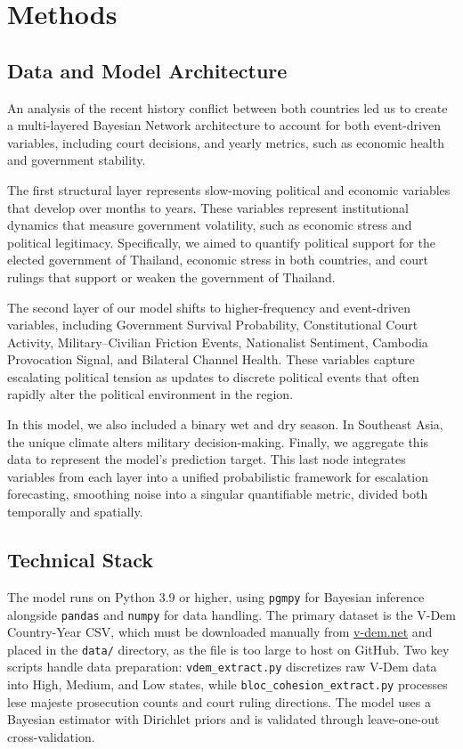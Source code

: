 \documentclass[12pt]{article}
\begin{document}
\section*{Methods}

\subsection*{Data and Model Architecture}

An analysis of the recent history conflict between both countries led us to create a multi-layered Bayesian Network architecture to account for both event-driven variables, including court decisions, and yearly metrics, such as economic health and government stability.

The first structural layer represents slow-moving political and economic variables that develop over months to years. These variables represent institutional dynamics that measure government volatility, such as economic stress and political legitimacy. Specifically, we aimed to quantify political support for the elected government of Thailand, economic stress in both countries, and court rulings that support or weaken the government of Thailand.

The second layer of our model shifts to higher-frequency and event-driven variables, including Government Survival Probability, Constitutional Court Activity, Military--Civilian Friction Events, Nationalist Sentiment, Cambodia Provocation Signal, and Bilateral Channel Health. These variables capture escalating political tension as updates to discrete political events that often rapidly alter the political environment in the region.

In this model, we also included a binary wet and dry season. In Southeast Asia, the unique climate alters military decision-making. Finally, we aggregate this data to represent the model's prediction target. This last node integrates variables from each layer into a unified probabilistic framework for escalation forecasting, smoothing noise into a singular quantifiable metric, divided both temporally and spatially.

\subsection*{Technical Stack}

The model runs on Python 3.9 or higher, using \texttt{pgmpy} for Bayesian inference alongside \texttt{pandas} and \texttt{numpy} for data handling. The primary dataset is the V-Dem Country-Year CSV, which must be downloaded manually from \url{v-dem.net} and placed in the \texttt{data/} directory, as the file is too large to host on GitHub. Two key scripts handle data preparation: \texttt{vdem\_extract.py} discretizes raw V-Dem data into High, Medium, and Low states, while \texttt{bloc\_cohesion\_extract.py} processes lese majeste prosecution counts and court ruling directions. The model uses a Bayesian estimator with Dirichlet priors and is validated through leave-one-out cross-validation.
\end{document}
